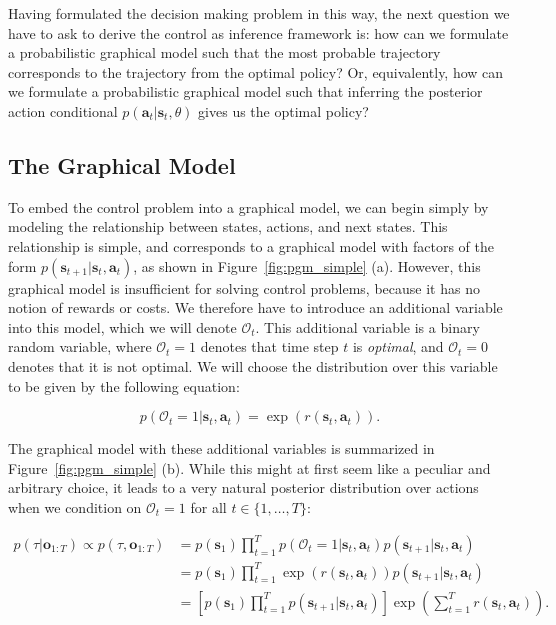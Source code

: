 Having formulated the decision making problem in this way, the next question we have to ask to derive the control as inference framework is: how can we formulate a probabilistic graphical model such that the most probable trajectory corresponds to the trajectory from the optimal policy? Or, equivalently, how can we formulate a probabilistic graphical model such that inferring the posterior action conditional $p(\mathbf{a}_t|\mathbf{s}_t, \theta)$ gives us the optimal policy?

\subsection{The Graphical Model}

To embed the control problem into a graphical model, we can begin simply by modeling the relationship between states, actions, and next states. This relationship is simple, and corresponds to a graphical model with factors of the form $p(\mathbf{s}_{t+1}|\mathbf{s}_t,\mathbf{a}_t)$, as shown in Figure~\ref{fig:pgm_simple} (a). However, this graphical model is insufficient for solving control problems, because it has no notion of rewards or costs. We therefore have to introduce an additional variable into this model, which we will denote $\mathcal{O}_t$. This additional variable is a binary random variable, where $\mathcal{O}_t = 1$ denotes that time step $t$ is \emph{optimal}, and $\mathcal{O}_t = 0$ denotes that it is not optimal. We will choose the distribution over this variable to be given by the following equation:

\begin{equation}
p(\mathcal{O}_t = 1 | \mathbf{s}_t, \mathbf{a}_t) = \exp(r(\mathbf{s}_t,\mathbf{a}_t)).\label{eq:opdef}
\end{equation}

The graphical model with these additional variables is summarized in Figure~\ref{fig:pgm_simple} (b). While this might at first seem like a peculiar and arbitrary choice, it leads to a very natural posterior distribution over actions when we condition on $\mathcal{O}_t = 1$ for all $t \in \{1, \dots, T\}$:

\begin{align}
p(\tau | \mathbf{o}_{1:T}) \propto p(\tau, \mathbf{o}_{1:T}) &= p(\mathbf{s}_1)\prod_{t=1}^T p(\mathcal{O}_t = 1 | \mathbf{s}_t, \mathbf{a}_t) p(\mathbf{s}_{t+1}|\mathbf{s}_t,\mathbf{a}_t) \nonumber \\
&= p(\mathbf{s}_1)\prod_{t=1}^T \exp(r(\mathbf{s}_t,\mathbf{a}_t)) p(\mathbf{s}_{t+1}|\mathbf{s}_t,\mathbf{a}_t) \nonumber \\
&= \left[ p(\mathbf{s}_1) \prod_{t=1}^T p(\mathbf{s}_{t+1}|\mathbf{s}_t,\mathbf{a}_t) \right] \exp\left( \sum_{t=1}^T r(\mathbf{s}_t,\mathbf{a}_t) \right).\label{eq:graphicalmodel}
\end{align}

